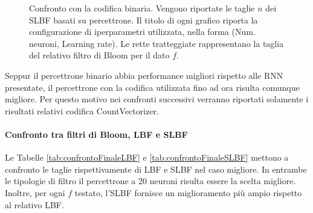 \documentclass[../../main.tex]{subfiles}
\begin{document}
\begin{figure}[H]
\begin{subfigure}[b]{0.48\textwidth}
            \caption{}  
        \end{subfigure}
        \caption{Confronto con la codifica binaria. Vengono riportate le taglie $n$ dei SLBF basati su percettrone. Il titolo di ogni grafico riporta la configurazione di iperparametri utilizzata, nella forma (Num. neuroni, Learning rate). Le rette tratteggiate rappresentano la taglia del relativo filtro di Bloom per il dato $f$.}
        \label{fig:tagliePercettroniBinSLBF}
    \end{figure}

    Seppur il percettrone binario abbia performance migliori rispetto alle RNN presentate, il percettrone con la codifica utilizzata fino ad ora risulta comunque migliore. Per questo motivo nei confronti successivi verranno riportati solamente i risultati relativi codifica CountVectorizer.

    \paragraph{Confronto tra filtri di Bloom, LBF e SLBF}
    Le Tabelle \ref{tab:confrontoFinaleLBF} e \ref{tab:confrontoFinaleSLBF} mettono a confronto le taglie rispettivamente di LBF e SLBF nel caso migliore. In entrambe le tipologie di filtro il percettrone a 20 neuroni risulta essere la scelta migliore. Inoltre, per ogni $f$ testato, l'SLBF fornisce un miglioramento più ampio rispetto al relativo LBF.
    
\end{document}
